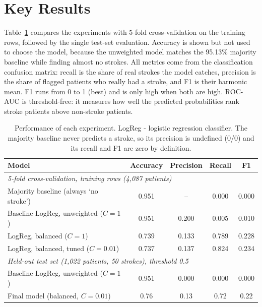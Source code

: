 \section{Key Results}
Table~\ref{tab:results} compares the experiments with 5-fold cross-validation on the training rows, followed by the single test-set evaluation.
Accuracy is shown but not used to choose the model, because the unweighted model matches the 95.13\% majority baseline while finding almost no strokes.
All metrics come from the classification confusion matrix: recall is the share of real strokes the model catches, precision is the share of flagged patients who really had a stroke, and F1 is their harmonic mean.
F1 runs from 0 to 1 (best) and is only high when both are high. ROC-AUC is threshold-free: it measures how well the predicted probabilities rank stroke patients above non-stroke patients.

\begin{table}[!htb]
\centering
\begin{tabular}{lcccc}
\hline
Model & Accuracy & Precision & Recall & F1 \\
\hline
\multicolumn{5}{l}{\textit{5-fold cross-validation, training rows (4,087 patients)}} \\
Majority baseline (always `no stroke') & 0.951 & -- & 0.000 & 0.000 \\
Baseline LogReg, unweighted ($C=1$) & 0.951 & 0.200 & 0.005 & 0.010 \\
LogReg, balanced ($C=1$) & 0.739 & 0.133 & 0.789 & 0.228 \\
LogReg, balanced, tuned ($C=0.01$) & 0.737 & 0.137 & 0.824 & 0.234 \\
\hline
\multicolumn{5}{l}{\textit{Held-out test set (1,022 patients, 50 strokes), threshold 0.5}} \\
Baseline LogReg, unweighted ($C=1$) & 0.951 & 0.000 & 0.000 & 0.000 \\
Final model (balanced, $C=0.01$) & 0.76 & 0.13 & 0.72 & 0.22 \\
\hline
\end{tabular}
\caption{Performance of each experiment. LogReg - logistic regression classifier. The majority baseline never predicts a stroke, so its precision is undefined (0/0) and its recall and F1 are zero by definition.}
\label{tab:results}
\end{table}

